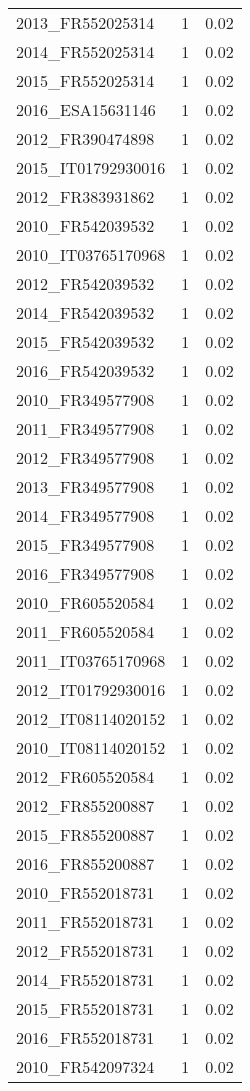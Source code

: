 \begin{table*}[htbp]
\begin{tabular}{lrr}
2013_FR552025314 & 1 & 0.02 \\
2014_FR552025314 & 1 & 0.02 \\
2015_FR552025314 & 1 & 0.02 \\
2016_ESA15631146 & 1 & 0.02 \\
2012_FR390474898 & 1 & 0.02 \\
2015_IT01792930016 & 1 & 0.02 \\
2012_FR383931862 & 1 & 0.02 \\
2010_FR542039532 & 1 & 0.02 \\
2010_IT03765170968 & 1 & 0.02 \\
2012_FR542039532 & 1 & 0.02 \\
2014_FR542039532 & 1 & 0.02 \\
2015_FR542039532 & 1 & 0.02 \\
2016_FR542039532 & 1 & 0.02 \\
2010_FR349577908 & 1 & 0.02 \\
2011_FR349577908 & 1 & 0.02 \\
2012_FR349577908 & 1 & 0.02 \\
2013_FR349577908 & 1 & 0.02 \\
2014_FR349577908 & 1 & 0.02 \\
2015_FR349577908 & 1 & 0.02 \\
2016_FR349577908 & 1 & 0.02 \\
2010_FR605520584 & 1 & 0.02 \\
2011_FR605520584 & 1 & 0.02 \\
2011_IT03765170968 & 1 & 0.02 \\
2012_IT01792930016 & 1 & 0.02 \\
2012_IT08114020152 & 1 & 0.02 \\
2010_IT08114020152 & 1 & 0.02 \\
2012_FR605520584 & 1 & 0.02 \\
2012_FR855200887 & 1 & 0.02 \\
2015_FR855200887 & 1 & 0.02 \\
2016_FR855200887 & 1 & 0.02 \\
2010_FR552018731 & 1 & 0.02 \\
2011_FR552018731 & 1 & 0.02 \\
2012_FR552018731 & 1 & 0.02 \\
2014_FR552018731 & 1 & 0.02 \\
2015_FR552018731 & 1 & 0.02 \\
2016_FR552018731 & 1 & 0.02 \\
2010_FR542097324 & 1 & 0.02 \\

\end{tabular}
\end{table*}
